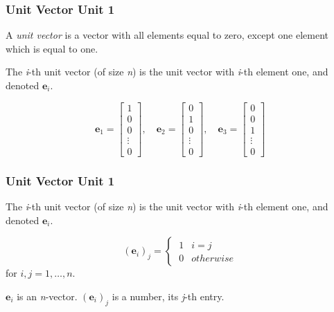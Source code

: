 \documentclass[12pt]{beamer}
\newcommand{\FrameTitle}[2]{\frametitle{#1 \hfill \small\textnormal{\textcolor{midgray}{#2}}}}
\newcommand{\vsp}{\vspace*{1em}}
\newcommand{\Vector}[1]{\textbf{#1}}
\begin{document}
\begin{frame}\FrameTitle{Unit Vector}{Unit 1}
    A \emph{unit vector} is a vector with all elements equal to zero,
    except one element which is equal to one.
    \vsp

    The \emph{i}-th unit vector (of size \emph{n}) is the unit vector
    with \emph{i}-th element one, and denoted $\Vector{e}_i$.

    \[
        \Vector{e}_1 = \begin{bmatrix}
            1 \\ 0 \\ 0 \\ \vdots \\ 0
        \end{bmatrix}, \quad
        \Vector{e}_2 = \begin{bmatrix}
            0 \\ 1 \\ 0 \\ \vdots \\ 0
        \end{bmatrix}, \quad
        \Vector{e}_3 = \begin{bmatrix}
            0 \\ 0 \\ 1 \\ \vdots \\ 0
        \end{bmatrix}
    \]
\end{frame}

\begin{frame}\FrameTitle{Unit Vector}{Unit 1}
    The \emph{i}-th unit vector (of size \emph{n}) is the unit vector
    with \emph{i}-th element one, and denoted $\Vector{e}_i$.

    \begin{equation}
        (\Vector{e}_i)_j = \begin{cases}
            \ 1 & i = j \\
            \ 0 & otherwise
        \end{cases}
    \end{equation}
    for $i,j = 1, \ldots, n$.

    \vsp
    $\Vector{e}_i$ is an \emph{n}-vector. $(\Vector{e}_i)_j$ is a number, its \emph{j}-th entry.
\end{frame}
\end{document}
